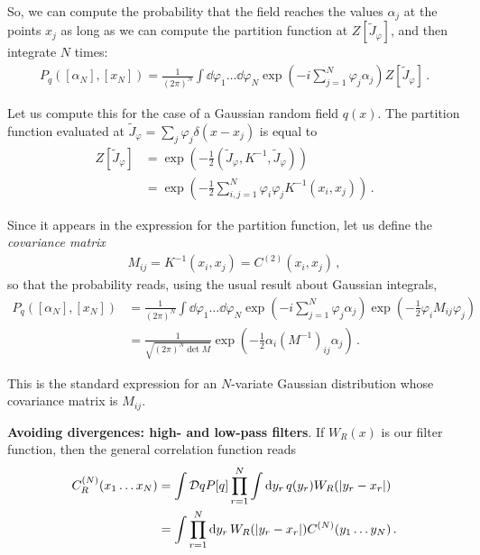 \documentclass[main.tex]{subfiles}
\begin{document}
So, we can compute the probability that the field reaches the values \(\alpha _j\) at the points \(x_j\) as long as we can compute the partition function at \(Z[\widetilde{J}_\varphi ]\), and then integrate \(N\) times: 
%
\begin{align}
P_q ([\alpha _N], [x_N]) = \frac{1}{(2 \pi)^{N}} 
\int \dd{\varphi_1 } \dots \dd{\varphi _N }
\exp(-i \sum _{j=1}^{N} \varphi _j \alpha_j )
Z[\widetilde{J}_\varphi ]
\,.
\end{align}

Let us compute this for the case of a Gaussian random field \(q(x)\). The partition function evaluated at \(\widetilde{J}_\varphi = \sum _{j} \varphi _j \delta (x- x_j)\) is equal to 
%
\begin{align}
Z[\widetilde{J}_\varphi ] &= \exp( - \frac{1}{2} (\widetilde{J}_\varphi , K^{-1}, \widetilde{J}_\varphi )) \\
&= \exp( - \frac{1}{2} \sum _{i, j =1}^{N} \varphi _i \varphi _j K^{-1} (x_i, x_j))
\,.
\end{align}

Since it appears in the expression for the partition function, let us define the \emph{covariance matrix}
%
\begin{align}
M_{ij} = K^{-1}(x_i, x_j) = C^{(2)} (x_i, x_j)
\,,
\end{align}
%
so that the probability reads, using the usual result about Gaussian integrals,
%
\begin{align}
P_q ([\alpha _N], [x_N]) &= \frac{1}{(2 \pi)^{N}} 
\int \dd{\varphi_1 } \dots \dd{\varphi _N }
\exp(-i \sum _{j=1}^{N} \varphi _j \alpha_j )
\exp(- \frac{1}{2} \varphi_i M_{ij } \varphi _j)  \\
&= \frac{1}{\sqrt{(2 \pi)^{N} \det M}}
\exp(- \frac{1}{2} \alpha _i (M^{-1})_{ij} \alpha _j)
\,.
\end{align}

This is the standard expression for an \(N\)-variate Gaussian distribution whose covariance matrix is \(M_{ij}\). 


\textbf{Avoiding divergences: high- and low-pass filters}. 
If \(W_R (x)\) is our filter function, then the general correlation function reads 
%
\begin{align}
C^{(N)}_R (x_1 \dots x_N) &= \int \mathcal{D}q P[q] \prod_{r = 1}^{N}
\int \dd{y_r} q(y_r) W_R (\abs{y_r - x_r})  \\
&= \int \prod_{r=1}^{N} \dd{y_r} W_R(\abs{y_r - x_r}) C^{(N)} (y_1 \dots y_N)
\,.
\end{align}
\end{document}
